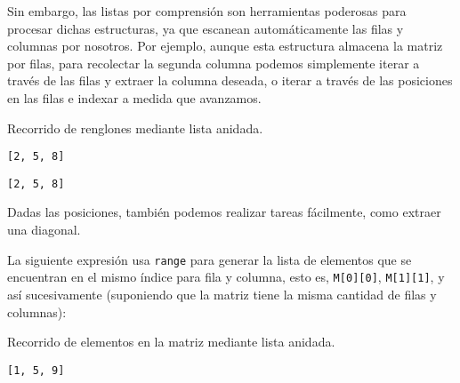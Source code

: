 Sin embargo, las listas por comprensión son herramientas poderosas para
procesar dichas estructuras, ya que escanean automáticamente las filas y
columnas por nosotros. Por ejemplo, aunque esta estructura almacena la
matriz por filas, para recolectar la segunda columna podemos simplemente
iterar a través de las filas y extraer la columna deseada, o iterar a
través de las posiciones en las filas e indexar a medida que avanzamos. \\

\begin{code} Recorrido de renglones mediante lista anidada.

\begin{Shaded}
\begin{Highlighting}[]
\NormalTok{[row[}\NormalTok{] }\NormalTok{ M]}
\end{Highlighting}
\end{Shaded}

\begin{verbatim}
[2, 5, 8]
\end{verbatim}

\begin{Shaded}
\begin{Highlighting}[]
\NormalTok{[M[row][}\NormalTok{] }\NormalTok{ (}\NormalTok{, }\NormalTok{, }\NormalTok{)]}
\end{Highlighting}
\end{Shaded}

\begin{verbatim}
[2, 5, 8]
\end{verbatim}
\end{code}

Dadas las posiciones, también podemos realizar tareas fácilmente, como
extraer una diagonal.

La siguiente expresión usa \texttt{range} para generar la lista de
elementos que se encuentran en el mismo índice para fila y columna, esto
es, \texttt{M{[}0{]}{[}0{]}}, \texttt{M{[}1{]}{[}1{]}}, y así
sucesivamente (suponiendo que la matriz tiene la misma cantidad de filas
y columnas):\\

\begin{code} Recorrido de elementos en la matriz mediante lista anidada.

\begin{Shaded}
\begin{Highlighting}[]
\NormalTok{[M[i][i] } \NormalTok{(}\NormalTok{(M))]}
\end{Highlighting}
\end{Shaded}

\begin{verbatim}
[1, 5, 9]
\end{verbatim}
\end{code}

